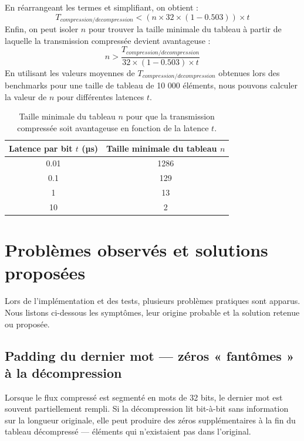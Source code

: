 \documentclass{rapportClass} %
\begin{document}
En réarrangeant les termes et simplifiant, on obtient :
\begin{equation}
    T_{compression/decompression} < (n \times 32 \times (1 - 0.503)) \times t
\end{equation}
Enfin, on peut isoler $n$ pour trouver la taille minimale du tableau à partir de laquelle la transmission compressée devient avantageuse :
\begin{equation}
    n > \frac{T_{compression/decompression}}{32 \times (1 - 0.503) \times t}
\end{equation}  
En utilisant les valeurs moyennes de $T_{compression/decompression}$ obtenues lors des benchmarks pour une taille de tableau de 10 000 éléments,
nous pouvons calculer la valeur de $n$ pour différentes latences $t$.
\begin{table}[H]
    \centering
    \caption{Taille minimale du tableau $n$ pour que la transmission compressée soit avantageuse en fonction de la latence $t$.}
    \label{tab:transmission_thresholds}
    \begin{tabular}{|c|c|}
        \hline
        \textbf{Latence par bit $t$ (µs)} & \textbf{Taille minimale du tableau $n$} \\
        \hline
        0.01 &  1286 \\
        \hline
        0.1  &  129 \\
        \hline
        1    &  13  \\
        \hline
        10   &  2   \\
        \hline
    \end{tabular}
\end{table}

\chapter{Problèmes observés et solutions proposées}

Lors de l'implémentation et des tests, plusieurs problèmes pratiques sont apparus. Nous listons
ci-dessous les symptômes, leur origine probable et la solution retenue ou proposée.

\section{Padding du dernier mot — zéros « fantômes » à la décompression}
Lorsque le flux compressé est segmenté en mots de 32 bits, le dernier mot est souvent partiellement rempli.
Si la décompression lit bit-à-bit sans information sur la longueur originale, elle peut produire des zéros
supplémentaires à la fin du tableau décompressé — éléments qui n'existaient pas dans l'original.
\end{document}
